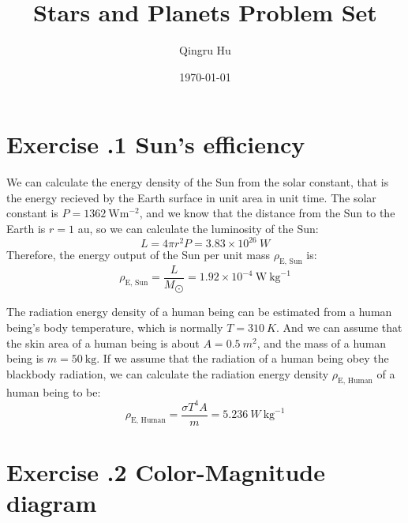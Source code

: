 \documentclass[a4paper,12pt]{article}
\title{\textbf{Stars and Planets Problem Set \uppercase\expandafter{\romannumeral1}}}
\author{Qingru Hu}
\date{\today}
\begin{document}
\maketitle

\section*{\textbf{Exercise \uppercase\expandafter{}.1 Sun's efficiency}}
We can calculate the energy density of the Sun from the 
solar constant, that is the energy recieved by the Earth surface in 
unit area in unit time. 
The solar constant is $P = 1362 \ \text{W} \text{m}^{-2}$, and we know that 
the distance from the Sun to the Earth is $r = 1$ au, so we 
can calculate the luminosity of the Sun:
\begin{equation}
    L = 4 \pi r^2 P = 3.83 \times 10^{26} \ W
\end{equation}
Therefore, the energy output of the Sun per unit mass $\rho_\text{E, Sun}$ is:
\begin{equation}
    \rho_\text{E, Sun} = \frac{L}{M_{\bigodot}} = 1.92 \times 10^{-4} \ \text{W} \ \text{kg}^{-1}
\end{equation}

The radiation energy density of a human being can be 
estimated from a human being's body temperature, which is normally $T = 310 \ K$.
And we can assume that the skin area of a human being is about $A=0.5 \ m^2$, and 
the mass of a human being is $m = 50 \ \text{kg}$.
If we assume that the radiation of a human being obey the blackbody radiation, 
we can calculate the radiation energy density $\rho_{\text{E, Human}}$ of a human being to be:
\begin{equation}
    \rho_\text{E, Human} = \frac{\sigma T^4 A}{m} = 5.236 \ W \ \text{kg}^{-1}
\end{equation}

\section*{\textbf{Exercise \uppercase\expandafter{}.2 Color-Magnitude diagram}}
\end{document}
